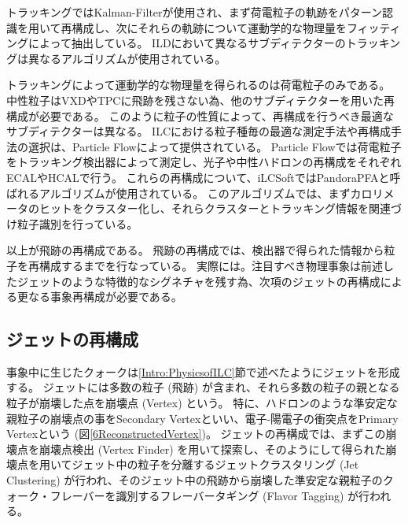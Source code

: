 トラッキングではKalman-Filterが使用され、まず荷電粒子の軌跡をパターン認識を用いて再構成し、次にそれらの軌跡について運動学的な物理量をフィッティングによって抽出している。
ILDにおいて異なるサブディテクターのトラッキングは異なるアルゴリズムが使用されている。

トラッキングによって運動学的な物理量を得られるのは荷電粒子のみである。
中性粒子はVXDやTPCに飛跡を残さない為、他のサブディテクターを用いた再構成が必要である。
このように粒子の性質によって、再構成を行うべき最適なサブディテクターは異なる。
ILCにおける粒子種毎の最適な測定手法や再構成手法の選択は、Particle Flowによって提供されている。
Particle Flowでは荷電粒子をトラッキング検出器によって測定し、光子や中性ハドロンの再構成をそれぞれECALやHCALで行う。
これらの再構成について、iLCSoftではPandoraPFAと呼ばれるアルゴリズムが使用されている。
このアルゴリズムでは、まずカロリメータのヒットをクラスター化し、それらクラスターとトラッキング情報を関連づけ粒子識別を行っている。

以上が飛跡の再構成である。
飛跡の再構成では、検出器で得られた情報から粒子を再構成するまでを行なっている。
実際には。注目すべき物理事象は前述したジェットのような特徴的なシグネチャを残す為、次項のジェットの再構成による更なる事象再構成が必要である。


\subsection{ジェットの再構成} \label{Intro:SoftERILC:JetReconstruction}

事象中に生じたクォークは\ref{Intro:PhysicsofILC}節で述べたようにジェットを形成する。
ジェットには多数の粒子 (飛跡) が含まれ、それら多数の粒子の親となる粒子が崩壊した点を崩壊点 (Vertex) という。
特に、ハドロンのような準安定な親粒子の崩壊点の事をSecondary Vertexといい、電子-陽電子の衝突点をPrimary Vertexという (図\ref{6ReconstructedVertex})。
ジェットの再構成では、まずこの崩壊点を崩壊点検出 (Vertex Finder) を用いて探索し、そのようにして得られた崩壊点を用いてジェット中の粒子を分離するジェットクラスタリング (Jet Clustering) が行われ、そのジェット中の飛跡から崩壊した準安定な親粒子のクォーク・フレーバーを識別するフレーバータギング (Flavor Tagging) が行われる。

